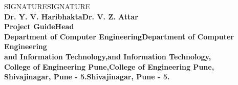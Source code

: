 \begin{center}		%

SIGNATURESIGNATURE\\
\normalsize{\bf{Dr. Y. V. HaribhaktaDr. V. Z. Attar\\
Project GuideHead}\\
Department of Computer EngineeringDepartment of Computer Engineering\\
and Information Technology,and Information Technology,\\
College of Engineering Pune,College of Engineering Pune,\\
Shivajinagar, Pune - 5.Shivajinagar, Pune - 5.}
\end{center}

